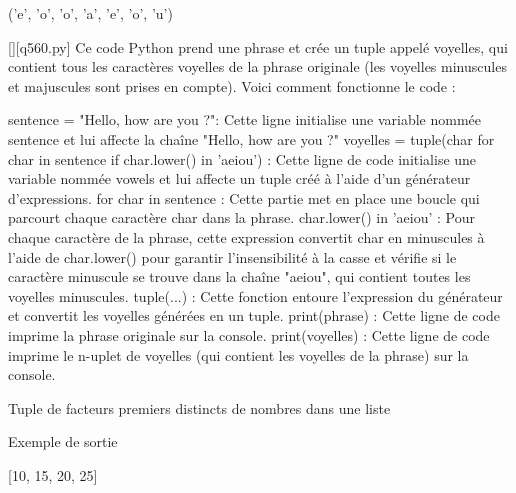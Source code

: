 ('e', 'o', 'o', 'a', 'e', 'o', 'u')
        \par
        \begin{solution}
            \renewcommand{\nomfichier}{q560.py}
            \pythonfile{\chemincode \nomfichier}[][\nomfichier]
            Ce code Python prend une phrase et crée un tuple appelé voyelles, qui contient tous les caractères voyelles de la phrase originale (les voyelles minuscules et majuscules sont prises en compte). Voici comment fonctionne le code :

    sentence = "Hello, how are you ?": Cette ligne initialise une variable nommée sentence et lui affecte la chaîne "Hello, how are you ?"
    voyelles = tuple(char for char in sentence if char.lower() in 'aeiou') : Cette ligne de code initialise une variable nommée vowels et lui affecte un tuple créé à l'aide d'un générateur d'expressions.
        for char in sentence : Cette partie met en place une boucle qui parcourt chaque caractère char dans la phrase.
        char.lower() in 'aeiou' : Pour chaque caractère de la phrase, cette expression convertit char en minuscules à l'aide de char.lower() pour garantir l'insensibilité à la casse et vérifie si le caractère minuscule se trouve dans la chaîne "aeiou", qui contient toutes les voyelles minuscules.
        tuple(...) : Cette fonction entoure l'expression du générateur et convertit les voyelles générées en un tuple.
    print(phrase) : Cette ligne de code imprime la phrase originale sur la console.
    print(voyelles) : Cette ligne de code imprime le n-uplet de voyelles (qui contient les voyelles de la phrase) sur la console.
        \end{solution}
        

        \question
        Tuple de facteurs premiers distincts de nombres dans une liste

Exemple de sortie

[10, 15, 20, 25]

